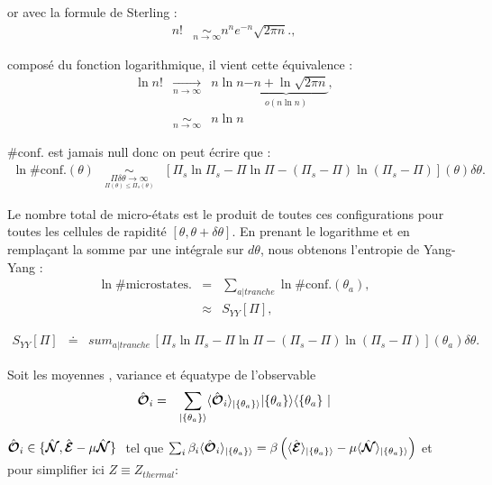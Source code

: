	or avec la formule de Sterling :  
	\begin{eqnarray}
		n! & \underset{n \to \infty}{\sim} n^n e^{-n} \sqrt{2\pi n}.,
	\end{eqnarray}
	
	composé du fonction logarithmique, il vient cette équivalence : 
	\begin{eqnarray}
		\ln n! & \underset{n \to \infty}{\rightarrow} & n \ln n \underbrace{- n + \ln \sqrt{2 \pi n }}_{o \left ( n \ln n \right ) } ,\\
		&  \underset{n \to \infty}{\sim} & n \ln n  
	\end{eqnarray}
	
	$\# \mbox{conf.}$ est jamais null donc on peut écrire que : 
\begin{eqnarray}
    \ln \# \mbox{conf.}(\theta) & \underset{\underset{\Pi (\theta )\leq  \Pi_s (\theta )}{\Pi \delta \theta  \to \infty}}{\sim}   & [ \Pi_s\ln \Pi_s - \Pi \ln \Pi - ( \Pi_s - \Pi ) \ln ( \Pi_s - \Pi) ] (\theta )\delta \theta .
\end{eqnarray}

Le nombre total de micro-états est le produit de toutes ces configurations pour toutes les cellules de rapidité $[\theta, \theta + \delta \theta]$. En prenant le logarithme et en remplaçant la somme par une intégrale sur $d \theta$, nous obtenons l'entropie de Yang-Yang :
\begin{eqnarray}
    \ln \# \mbox{microstates.} & = & \sum_{a\vert tranche} \ln \# \mbox{conf.}(\theta_a), \\
    & \approx &   S_{YY} [ \Pi ] , 	
\end{eqnarray}

\begin{eqnarray}
    S_{YY}[\Pi] & \doteq & sum_{a\vert tranche} \, [ \Pi_s\ln \Pi_s - \Pi \ln \Pi - ( \Pi_s - \Pi ) \ln ( \Pi_s - \Pi ) ] (\theta_a) \delta \theta .
\end{eqnarray}

Soit les moyennes , variance et équatype de l'observable 
	\begin{eqnarray}
		\operator{\mathcal{O}}_i & = & \sum_{\vert \{\theta_a \} \rangle} \langle \operator{\mathcal{O}}_i \rangle_{\vert \{\theta_a \} \rangle}  \vert \{ \theta_a\}\rangle	\langle \{ \theta_a \} \vert
	\end{eqnarray}
	
	$\operator{\mathcal{O}}_i \in \{\operator{\mathcal{N}} , \operator{\mathcal{E}} - \mu \operator{\mathcal{N}} \} $  tel que $\sum_i \beta_i \langle \hat{\bm{\mathcal{O}}}_i \rangle_{\vert \{\theta_a \} \rangle} = \beta \left ( \langle \hat{\bm{\mathcal{E}}} \rangle_{\vert \{\theta_a \} \rangle}   - \mu \langle \hat{\bm{\mathcal{N}}} \rangle_{\vert \{\theta_a \} \rangle} \right ) $ et pour simplifier ici $Z \equiv Z_{thermal}$:
	
